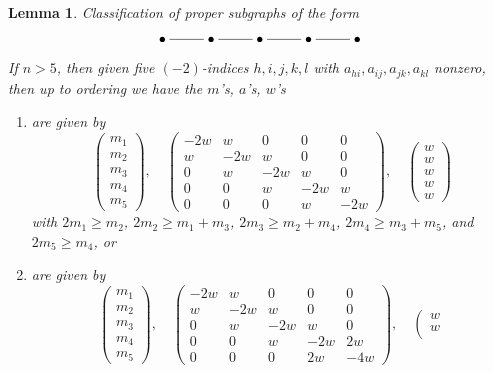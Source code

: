 \documentclass{stacks-project}
\theoremstyle{plain}
\newtheorem{lemma}[subsection]{Lemma}
\theoremstyle{definition}
\theoremstyle{remark}
\numberwithin{equation}{subsection}
\begin{document}
\begin{lemma}
\label{lemma-five-by-five}
Classification of proper subgraphs of the form
$$
\xymatrix{
\bullet \ar@{-}[r] &
\bullet \ar@{-}[r] &
\bullet \ar@{-}[r] &
\bullet \ar@{-}[r] &
\bullet
}
$$
If $n > 5$, then given five $(-2)$-indices $h, i, j, k, l$
with $a_{hi}, a_{ij}, a_{jk}, a_{kl}$ nonzero, then up
to ordering we have the $m$'s, $a$'s, $w$'s
\begin{enumerate}
\item
\label{item-A5}
are given by
$$
\left(
\begin{matrix}
m_1 \\
m_2 \\
m_3 \\
m_4 \\
m_5
\end{matrix}
\right),
\quad
\left(
\begin{matrix}
-2w & w & 0 & 0 & 0 \\
w & -2w & w & 0 & 0 \\
0 & w & -2w & w & 0 \\
0 & 0 & w & -2w & w \\
0 & 0 & 0 & w & -2w
\end{matrix}
\right),
\quad
\left(
\begin{matrix}
w \\
w \\
w \\
w \\
w
\end{matrix}
\right)
$$
with $2m_1 \geq m_2$, $2m_2 \geq m_1 + m_3$, $2m_3 \geq m_2 + m_4$,
$2m_4 \geq m_3 + m_5$, and $2m_5 \geq m_4$, or
\item
\label{item-C5}
are given by
$$
\left(
\begin{matrix}
m_1 \\
m_2 \\
m_3 \\
m_4 \\
m_5
\end{matrix}
\right),
\quad
\left(
\begin{matrix}
-2w & w & 0 & 0 & 0 \\
w & -2w & w & 0 & 0 \\
0 & w & -2w & w & 0 \\
0 & 0 & w & -2w & 2w \\
0 & 0 & 0 & 2w & -4w
\end{matrix}
\right),
\quad
\left(
\begin{matrix}
w \\
w \\

\end{matrix}$$
\end{enumerate}
\end{lemma}
\end{document}
